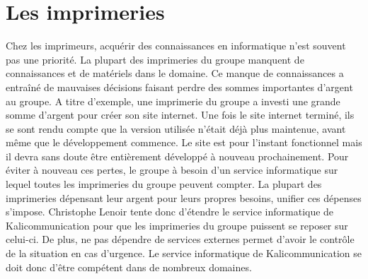 
\section{Les imprimeries}
Chez les imprimeurs, acquérir des connaissances en informatique n'est souvent pas une priorité. La plupart des imprimeries du groupe manquent de connaissances et de matériels dans le domaine. Ce manque de connaissances a entraîné de mauvaises décisions faisant perdre des sommes importantes d'argent au groupe.\newline
A titre d'exemple, une imprimerie du groupe a investi une grande somme d'argent pour créer son site internet. Une fois le site internet terminé, ils se sont rendu compte que la version utilisée n'était déjà plus maintenue, avant même que le développement commence. Le site est pour l'instant fonctionnel mais il devra sans doute être entièrement développé à nouveau prochainement.\newline
Pour éviter à nouveau ces pertes, le groupe à besoin d'un service informatique sur lequel toutes les imprimeries du groupe peuvent compter. La plupart des imprimeries dépensant leur argent pour leurs propres besoins, unifier ces dépenses s'impose. Christophe Lenoir tente donc d'étendre le service informatique de Kalicommunication pour que les imprimeries du groupe puissent se reposer sur celui-ci. De plus, ne pas dépendre de services externes permet d'avoir le contrôle de la situation en cas d'urgence. Le service informatique de Kalicommunication se doit donc d'être compétent dans de nombreux domaines.

